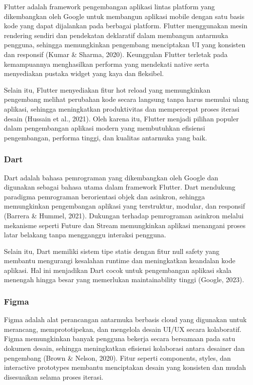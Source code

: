Flutter adalah framework pengembangan aplikasi lintas platform yang dikembangkan oleh Google untuk membangun aplikasi mobile dengan satu basis kode yang dapat dijalankan pada berbagai platform. Flutter menggunakan mesin rendering sendiri dan pendekatan deklaratif dalam membangun antarmuka pengguna, sehingga memungkinkan pengembang menciptakan UI yang konsisten dan responsif (Kumar \& Sharma, 2020). Keunggulan Flutter terletak pada kemampuannya menghasilkan performa yang mendekati native serta menyediakan pustaka widget yang kaya dan fleksibel.

Selain itu, Flutter menyediakan fitur hot reload yang memungkinkan pengembang melihat perubahan kode secara langsung tanpa harus memulai ulang aplikasi, sehingga meningkatkan produktivitas dan mempercepat proses iterasi desain (Hussain et al., 2021). Oleh karena itu, Flutter menjadi pilihan populer dalam pengembangan aplikasi modern yang membutuhkan efisiensi pengembangan, performa tinggi, dan kualitas antarmuka yang baik.


\subsubsection{Dart}

Dart adalah bahasa pemrograman yang dikembangkan oleh Google dan digunakan sebagai bahasa utama dalam framework Flutter. Dart mendukung paradigma pemrograman berorientasi objek dan asinkron, sehingga memungkinkan pengembangan aplikasi yang terstruktur, modular, dan responsif (Barrera \& Hummel, 2021). Dukungan terhadap pemrograman asinkron melalui mekanisme seperti Future dan Stream memungkinkan aplikasi menangani proses latar belakang tanpa mengganggu interaksi pengguna.

Selain itu, Dart memiliki sistem tipe statis dengan fitur null safety yang membantu mengurangi kesalahan runtime dan meningkatkan keandalan kode aplikasi. Hal ini menjadikan Dart cocok untuk pengembangan aplikasi skala menengah hingga besar yang memerlukan maintainability tinggi (Google, 2023).


\subsubsection{Figma}

Figma adalah alat perancangan antarmuka berbasis cloud yang digunakan untuk merancang, memprototipekan, dan mengelola desain UI/UX secara kolaboratif. Figma memungkinkan banyak pengguna bekerja secara bersamaan pada satu dokumen desain, sehingga meningkatkan efisiensi kolaborasi antara desainer dan pengembang (Brown \& Nelson, 2020). Fitur seperti components, styles, dan interactive prototypes membantu menciptakan desain yang konsisten dan mudah disesuaikan selama proses iterasi.

